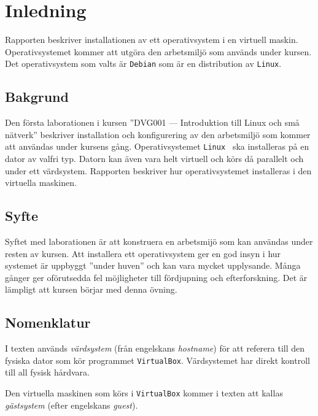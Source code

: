 %

\section{Inledning}\label{inledning}
Rapporten beskriver installationen av ett operativsystem i en
virtuell maskin. Operativsystemet kommer att utgöra den arbetsmiljö som används
under kursen. Det operativsystem som valts är \texttt{Debian} som är en
distribution av \texttt{Linux}.


\subsection{Bakgrund}
Den första laborationen i kursen ''DVG001 --- Introduktion till Linux och små
nätverk'' beskriver installation och konfigurering av den arbetsmiljö som
kommer att användas under kursens gång. Operativsystemet \texttt{Linux } ska
installeras på en dator av valfri typ.  Datorn kan även vara helt virtuell och
körs då parallelt och under ett värdsystem. Rapporten beskriver hur
operativsystemet installeras i den virtuella maskinen.


\subsection{Syfte}
Syftet med laborationen är att konstruera en arbetsmijö som kan användas under
resten av kursen. Att installera ett operativsystem ger en god insyn i hur 
systemet är uppbyggt ''under huven'' och kan vara mycket upplysande.
Många gånger ger oförutsedda fel möjligheter till fördjupning och
efterforskning. Det är lämpligt att kursen börjar med denna övning.


\subsection{Nomenklatur}
I texten används \emph{värdsystem} (från engelskans \emph{hostname}) för att
referera till den fysiska dator som kör programmet \texttt{VirtualBox}.
Värdsystemet har direkt kontroll till all fysisk hårdvara.
\par Den virtuella maskinen som körs i \texttt{VirtualBox} kommer i texten att
kallas \emph{gästsystem} (efter engelskans \emph{guest}).
